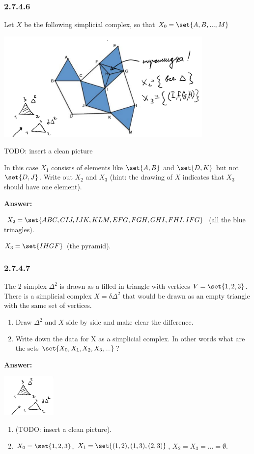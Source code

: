 \documentclass{article}
\newcommand{\N}{\mathbb{N}}
\newcommand{\Pow}{\mathbb{P}}
\newcommand{\vsp}[0]{\vspace*{10pt}\par}
\newcommand{\exercise}[1]{\subsubsection*{#1}}
\newcommand{\ans}[0]{\vsp\textbf{Answer: }\vsp}
\newcommand{\U}[1]{{\underline{#1}}}
\newcommand{\ei}{\item}
\newcommand{\eb}{\begin{enumerate}[label=(\alph*)]\ei}
\newcommand{\ee}{\end{enumerate}}
\begin{document}

\exercise{2.7.4.6}

Let $X$ be the following simplicial complex, so that $X_0 = \set{A, B, ... , M}$

\begin{center}
\includegraphics[width=0.8\textwidth]{img/simplicial_complex.png}
\end{center}

TODO: insert a clean picture

In this case $X_1$ consists of elements like $\set{A,B}$ and $\set{D,K}$ but not
$\set{D,J}$.  Write out $X_2$ and $X_3$ (hint: the drawing of $X$ indicates that
$X_3$ should have one element).

\ans

$X_2 = \set{ABC, CIJ, IJK, KLM, EFG, FGH, GHI, FHI, IFG}$ (all the blue
trinagles).

$X_3 = \set{IHGF}$ (the pyramid).

\exercise{2.7.4.7}

The 2-simplex $\Delta^2$ is drawn as a filled-in triangle with vertices $V =
\set{1, 2, 3}$. There is a simplicial complex $X = \delta \Delta^2$ that would
be drawn as an empty triangle with the same set of vertices.

\eb Draw $\Delta^2$ and $X$ side by side and make clear the difference.
\ei Write down the data for X as a simplicial complex. In other words what are
    the sets $\set{X_0, X_1, X_2, X_3, ...}$?
\ee

\ans
\begin{center}
\includegraphics[width=0.2\textwidth]{img/simplicial_complex_example.png}
\end{center}
\eb (TODO: insert a clean picture).
\ei $X_0 = \set{1,2,3}$, $X_1 = \set{(1,2), (1,3), (2,3)}$, $X_2 = X_3 = ... =
    \emptyset$.
\ee
\end{document}
